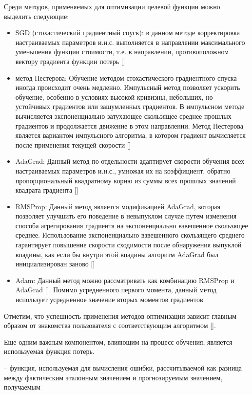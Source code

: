 Среди методов, применяемых для оптимизации целевой функции можно выделить следующие:

\begin{itemize}
	\item SGD (стохастический градиентный спуск): в данном методе корректировка настраиваемых параметров и.н.с. выполняется в направлении максимального уменьшения функции стоимости, т.е. в направлении, противоположном вектору градиента функции потерь []
	\item метод Нестерова: Обучение методом стохастического градиентного спуска иногда происходит очень медленно. Импульсный метод позволяет ускорить обучение, особенно в условиях высокой кривизны, небольших, но устойчивых градиентов или зашумленных градиентов. В импульсном методе вычисляется экспоненциально затухающее скользящее среднее прошлых градиентов и продолжается движение в этом направлении. Метод Нестерова является вариантом импульсного алгоритма, в котором градиент вычисляется после применения текущей скорости []
	\item AdaGrad: Данный метод по отдельности адаптирует скорости обучения всех настраиваемых параметров и.н.с., умножая их на коэффициент, обратно пропорциональный квадратному корню из суммы всех прошлых значений квадрата градиента []
	\item RMSProp: Данный метод является модификацией AdaGrad, которая позволяет улучшить его поведение в невыпуклом случае путем изменения способа агрегирования градиента на экспоненциально взвешенное скользящее среднее. Использование экспоненциально взвешенного скользящего среднего гарантирует повышение скорости сходимости после обнаружения выпуклой впадины, как если бы внутри этой впадины алгоритм AdaGrad был инициализирован заново []
	\item Adam: Данный метод можно рассматривать как комбинацию RMSProp и AdaGrad []. Помимо усредненного первого момента, данный метод использует усредненное значение вторых моментов градиентов
\end{itemize}

Отметим, что успешность применения методов оптимизации зависит главным образом от знакомства пользователя с соответствующим алгоритмом [].

Еще одним важным компонентом, влияющим на процесс обучения, является используемая функция потерь.

 -- функция, используемая для вычисления ошибки, рассчитываемой как разница между фактическим эталонным значением и прогнозируемым значением, получаемым 

